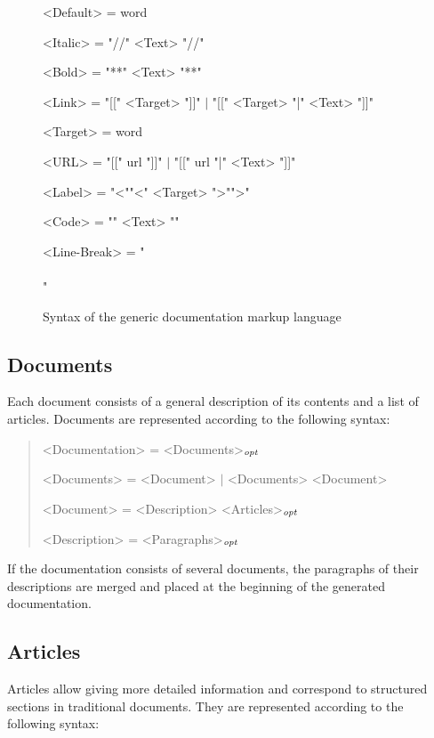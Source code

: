 \begin{figure}
\begin{minipage}{34em}
\begin{grammar}
<Default> = word \par
<Italic> = "//" <Text> "//" \par
<Bold> = "**" <Text> "**" \par
<Link> = "[[" <Target> "]]" $\mid$ "[[" <Target> "|" <Text> "]]" \par
<Target> = word \par
<URL> = "[[" url "]]" $\mid$ "[[" url "|" <Text> "]]" \par
<Label> = "<""<" <Target> ">"">" \par
<Code> = "{{{" <Text> "}}}" \par
<Line-Break> = "\\\\" \par
\end{grammar}\end{minipage}
\caption{Syntax of the generic documentation markup language}
\label{fig:docmarkupsyntax}
\end{figure}

\subsection{Documents}

Each document consists of a general description of its contents and a list of articles.
Documents are represented according to the following syntax:

\begin{quote}\begin{grammar}
<Documentation> = <Documents>$_\mathit{opt}$ \par
<Documents> = <Document> $\mid$ <Documents> <Document> \par
<Document> = <Description> <Articles>$_\mathit{opt}$ \par
<Description> = <Paragraphs>$_\mathit{opt}$ \par
\end{grammar}\end{quote}

If the documentation consists of several documents, the paragraphs of their descriptions are merged and placed at the beginning of the generated documentation.

\subsection{Articles}

Articles allow giving more detailed information and correspond to structured sections in traditional documents.
They are represented according to the following syntax:

